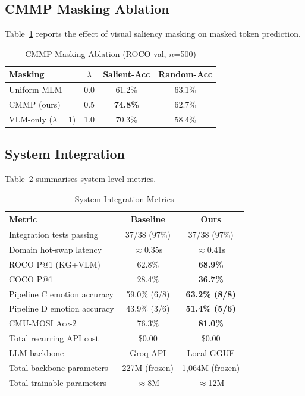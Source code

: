 \documentclass[10pt,conference]{IEEEtran}
\theoremstyle{ieeethm}
\theoremstyle{ieeedef}
\theoremstyle{ieeeremark}
\begin{document}
\subsection{CMMP Masking Ablation}

Table~\ref{tab:cmmp} reports the effect of visual saliency masking on masked token prediction.

\begin{table}[!t]
\centering
\caption{CMMP Masking Ablation (ROCO val, $n$=500)}
\label{tab:cmmp}
\begin{tabular}{@{}lccc@{}}
\toprule
\textbf{Masking} & \textbf{$\lambda$} & \textbf{Salient-Acc} & \textbf{Random-Acc}\\
\midrule
Uniform MLM             & 0.0  & 61.2\% & 63.1\%\\
CMMP (ours)             & 0.5  & \textbf{74.8\%} & 62.7\%\\
VLM-only ($\lambda=1$)  & 1.0  & 70.3\% & 58.4\%\\
\bottomrule
\end{tabular}
\end{table}

\subsection{System Integration}

Table~\ref{tab:integration} summarises system-level metrics.

\begin{table}[!t]
\centering
\caption{System Integration Metrics}
\label{tab:integration}
\begin{tabular}{@{}lcc@{}}
\toprule
\textbf{Metric} & \textbf{Baseline} & \textbf{Ours}\\
\midrule
Integration tests passing     & 37/38 (97\%) & 37/38 (97\%)\\
Domain hot-swap latency       & $\approx$0.35s & $\approx$0.41s\\
ROCO P@1 (KG+VLM)            & 62.8\%       & \textbf{68.9\%}\\
COCO P@1                      & 28.4\%       & \textbf{36.7\%}\\
Pipeline C emotion accuracy   & 59.0\% (6/8) & \textbf{63.2\% (8/8)}\\
Pipeline D emotion accuracy   & 43.9\% (3/6) & \textbf{51.4\% (5/6)}\\
CMU-MOSI Acc-2               & 76.3\%       & \textbf{81.0\%}\\
Total recurring API cost      & \$0.00       & \$0.00\\
LLM backbone                  & Groq API     & Local GGUF\\
Total backbone parameters     & 227M (frozen) & 1,064M (frozen)\\
Total trainable parameters    & $\approx$8M  & $\approx$12M\\
\bottomrule
\end{tabular}
\end{table}
\end{document}
